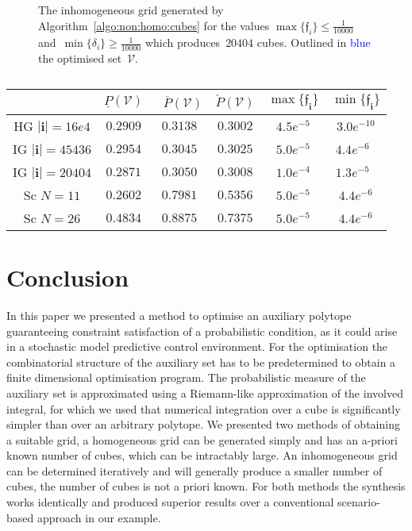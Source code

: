 \documentclass[letterpaper, 10pt, conference]{ieeeconf} %
\providecommand{\abs}[1]{\left\lvert#1\right\rvert}
\providecommand{\bfa}[1]{\mathbf{#1}}
\begin{document}
%
%
%
%
%
\begin{figure}\centering
{}

\fi
\caption{The inhomogeneous grid generated by Algorithm~\ref{algo:non:homo:cubes} for the values $\max\{\mathfrak{f}_i\}\leq\frac{1}{10000}$ and~$\min\{\delta_i\}\geq\frac{1}{10000}$ which produces~$20404$ cubes.
%
Outlined in \textcolor{blue}{blue} the optimised set~$\mathcal V$.}
\label{fig:inhomogeneous:grid}
\end{figure}
%
%
\begin{table}
\begin{tabular}{|c|c|c|c|c|c|}
\hline
& $\underline{P}(\mathcal V)$ & $\overline{P}(\mathcal V)$ & $\mathring{P}(\mathcal V)$ & $\max\{\mathfrak{f}_{\bfa{i}}\}$ & $\min\{\mathfrak{f}_\bfa{i}\}$\\
\hline HG $\abs{\bfa{i}}=16e4$ & $0.2909$ & $0.3138$ & $0.3002$ & $4.5e^{-5}$ & $3.0e^{-10}$ \\
\hline IG $\abs{\bfa{i}}=45436$ & $0.2954$ & $0.3045$ & $0.3025$ & $5.0e^{-5}$ & $4.4e^{-6}$ \\
\hline IG $\abs{\bfa{i}}=20404$ & $0.2871$ & $0.3050$ & $0.3008$ & $1.0e^{-4}$ & $1.3e^{-5}$ \\
\hline Sc $N=11$ & $0.2602$ & $0.7981$ & $0.5356$ & $5.0e^{-5}$ & $4.4e^{-6}$ \\ 
\hline Sc $N=26$ & $0.4834$ & $0.8875$ & $0.7375$ & $5.0e^{-5}$ & $4.4e^{-6}$ \\
\hline 
\end{tabular}
\caption{}
\label{tab:only:table}
\end{table}




\section{Conclusion}\label{sec:conclusion}
%
%
%
%
%
\noindent In this paper we presented a method to optimise an auxiliary polytope guaranteeing constraint satisfaction of a probabilistic condition, as it could arise in a stochastic model predictive control environment.
%
For the optimisation the combinatorial structure of the auxiliary set has to be predetermined to obtain a finite dimensional optimisation program.
%
The probabilistic measure of the auxiliary set is approximated using a Riemann-like approximation of the involved integral, for which we used that numerical integration over a cube is significantly simpler than over an arbitrary polytope.
%
We presented two methods of obtaining a suitable grid, a homogeneous grid can be generated simply and has an a-priori known number of cubes, which can be intractably large.
%
An inhomogeneous grid can be determined iteratively and will generally produce a smaller number of cubes, the number of cubes is not a priori known.
%
For both methods the synthesis works identically and produced superior results over a conventional scenario-based approach in our example.
%
\end{document}
